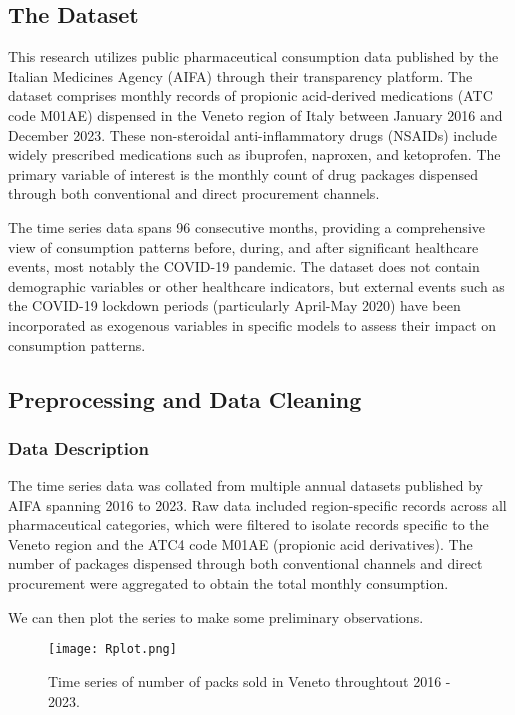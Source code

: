 \documentclass[10pt]{article}
\begin{document}
\subsection{The Dataset}
This research utilizes public pharmaceutical consumption data published by the Italian Medicines Agency (AIFA) through their transparency platform. The dataset comprises monthly records of propionic acid-derived medications (ATC code M01AE) dispensed in the Veneto region of Italy between January 2016 and December 2023. These non-steroidal anti-inflammatory drugs (NSAIDs) include widely prescribed medications such as ibuprofen, naproxen, and ketoprofen. The primary variable of interest is the monthly count of drug packages dispensed through both conventional and direct procurement channels.

The time series data spans 96 consecutive months, providing a comprehensive view of consumption patterns before, during, and after significant healthcare events, most notably the COVID-19 pandemic. The dataset does not contain demographic variables or other healthcare indicators, but external events such as the COVID-19 lockdown periods (particularly April-May 2020) have been incorporated as exogenous variables in specific models to assess their impact on consumption patterns.

\subsection{Preprocessing and Data Cleaning}

\subsubsection{Data Description}
The time series data was collated from multiple annual datasets published by AIFA spanning 2016 to 2023. Raw data included region-specific records across all pharmaceutical categories, which were filtered to isolate records specific to the Veneto region and the ATC4 code M01AE (propionic acid derivatives). The number of packages dispensed through both conventional channels and direct procurement were aggregated to obtain the total monthly consumption. 


 We can then plot the series to make some
preliminary observations.

\begin{figure}[ht]
\centering
\texttt{[image: Rplot.png]}
\caption{Time series of number of packs sold in Veneto throughtout 2016 - 2023.}
\label{fig:data_plot}
\end{figure}
\end{document}
